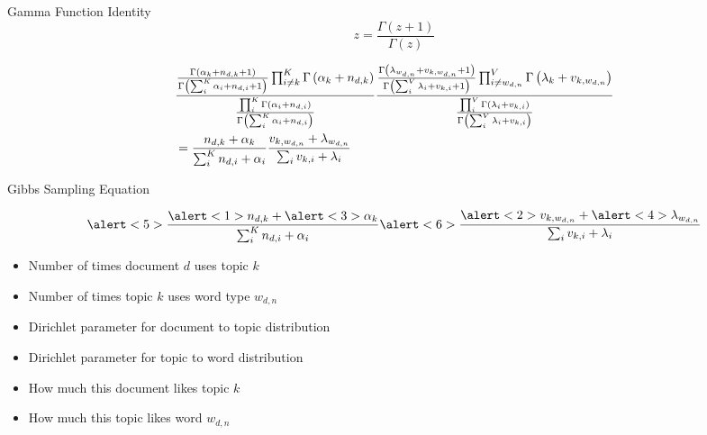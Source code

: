 \begin{frame}

\begin{block}{Gamma Function Identity}
	\begin{equation}
		z = \frac{\Gamma(z + 1)}{\Gamma(z)}
	\end{equation}
\end{block}

\begin{footnotesize}
\begin{align*}
& \frac{
  \dirnum{i \not = k}{K}{\alpha_k + n_{d,k} + 1}{ \g{\sum_{i}^{K} \alpha_i +
      n_{d,i} + 1} } \g{\alpha_k + n_{d,k}}  }
{ \dirfunc{i}{K}{\alpha_i + n_{d,i}} }
\frac{
 \dirnum{i \not = w_{d,n}}{V}{\lambda_{w_{d,n}} + v_{k,w_{d,n}} + 1}{ \g{\sum_{i}^{V} \lambda_i + v_{k,i} + 1} } \g{\lambda_k + v_{k,w_{d,n}}}
}{ \dirfunc{i}{V}{\lambda_i + v_{k,i}} } \\
& = \frac{n_{d, k} + \alpha_k}{ \sum_{i}^{K} { n_{d,i} + \alpha_i}} \frac{v_{k, w_{d,n}} + \lambda_{w_{d,n}}}{ \sum_{i} { v_{k,i} + \lambda_{i} }}
\end{align*}
\end{footnotesize}

\end{frame}
\else
\fi



\begin{frame}{Gibbs Sampling Equation}

\begin{equation}
\alert<5>{\frac{\alert<1>{n_{d, k}} +  \alert<3>{\alpha_k}}{ \sum_{i}^{K} { n_{d,i} +\alpha_i}}} \alert<6>{\frac{\alert<2>{v_{k, w_{d,n}}} + \alert<4>{\lambda_{w_{d,n}}}}{ \sum_{i} { v_{k,i} + \lambda_{i} }}}
\end{equation}

\begin{itemize}
  \item \alert<1>{Number of times document $d$ uses topic $k$}
  \item \alert<2>{Number of times topic $k$ uses word type $w_{d,n}$}
  \item \alert<3>{Dirichlet parameter for document to topic
      distribution}
  \item \alert<4>{Dirichlet parameter for topic to word distribution}
  \item \alert<5>{How much this document likes topic $k$}
  \item \alert<6>{How much this topic likes word $w_{d,n}$}
\end{itemize}

\end{frame}


